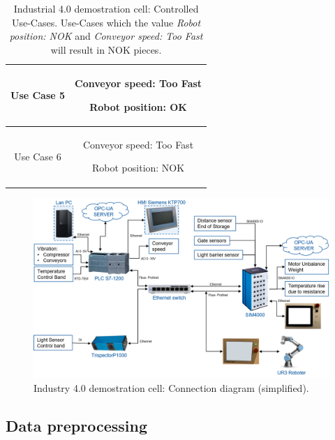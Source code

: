 \documentclass[5p,times,procedia]{elsarticle}
\begin{document}
\begin{table}
\begin{tabular}{ c c }
              Use Case 5  & \begin{minipage}[t]{0.25\textwidth}
                            \begin{description}
                                   \item Conveyor speed: Too Fast
                                   \item Robot position: OK
                            \end{description}
                            \end{minipage}  \\ \hline
              Use Case 6  & \begin{minipage}[t]{0.25\textwidth}
                            \begin{description}
                                   \item Conveyor speed: Too Fast
                                   \item Robot position: NOK
                            \end{description}
                            \end{minipage}  \\ \bottomrule
       \end{tabular}
       \caption{Industrial 4.0 demostration cell: Controlled Use-Cases.
       Use-Cases which the value \textit{Robot position: NOK} and \textit{Conveyor speed: Too Fast} will result in NOK pieces.}
       \label{tab:use_cases}
\end{table}


\begin{figure}
       \includegraphics[width=.45\textwidth]{img/demozelle_conex_diagram.png}
       \caption{Industry 4.0 demostration cell: Connection diagram (simplified).
             }
\label{fig:demo_conn_diag}
\end{figure}

\subsection{Data preprocessing}
\end{document}
